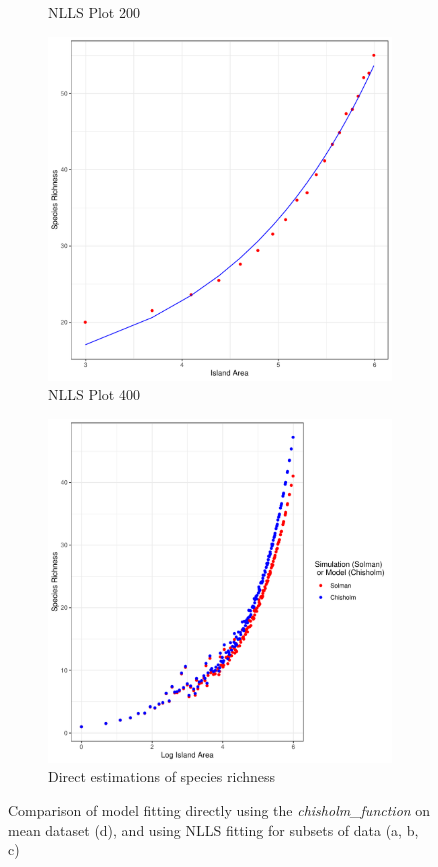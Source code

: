 \documentclass{article}
\begin{document}
\begin{figure}[h!]
\begin{subfigure}[b]{0.3\linewidth}
    \caption{NLLS Plot 200}
  \end{subfigure}
  \begin{subfigure}[b]{0.3\linewidth}
    \includegraphics[width=\linewidth]{../../../Results/Simulation2/NLLS/NLLSfits_400.pdf}
    \caption{NLLS Plot 400}
  \end{subfigure}
  \begin{subfigure}[b]{0.5\linewidth}
    \includegraphics[width=\linewidth]{../../../Results/Simulation2/MeanResultsPlot.pdf}
    \caption{Direct estimations of species richness}
  \end{subfigure}
  \caption{Comparison of model fitting directly using the \textit{chisholm\_function} on mean dataset (d), and using NLLS fitting for subsets of data (a, b, c)}
  \label{fig:fitting}
\end{figure}

  
\end{document}
